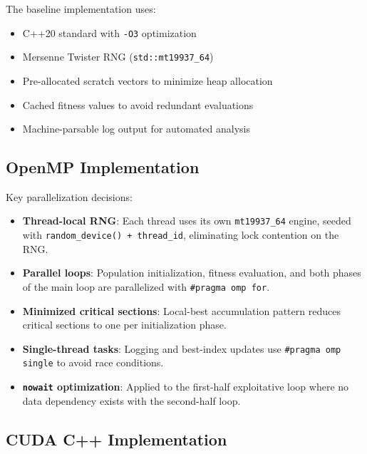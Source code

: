 \documentclass[12pt, a4paper]{article}
\begin{document}
The baseline implementation uses:
\begin{itemize}
    \item C++20 standard with \texttt{-O3} optimization
    \item Mersenne Twister RNG (\texttt{std::mt19937\_64})
    \item Pre-allocated scratch vectors to minimize heap allocation
    \item Cached fitness values to avoid redundant evaluations
    \item Machine-parsable log output for automated analysis
\end{itemize}

\subsection{OpenMP Implementation}

Key parallelization decisions:
\begin{itemize}
    \item \textbf{Thread-local RNG}: Each thread uses its own \texttt{mt19937\_64} engine, seeded with \texttt{random\_device() + thread\_id}, eliminating lock contention on the RNG.
    \item \textbf{Parallel loops}: Population initialization, fitness evaluation, and both phases of the main loop are parallelized with \texttt{\#pragma omp for}.
    \item \textbf{Minimized critical sections}: Local-best accumulation pattern reduces critical sections to one per initialization phase.
    \item \textbf{Single-thread tasks}: Logging and best-index updates use \texttt{\#pragma omp single} to avoid race conditions.
    \item \textbf{\texttt{nowait} optimization}: Applied to the first-half exploitative loop where no data dependency exists with the second-half loop.
\end{itemize}

\subsection{CUDA C++ Implementation}
\end{document}
